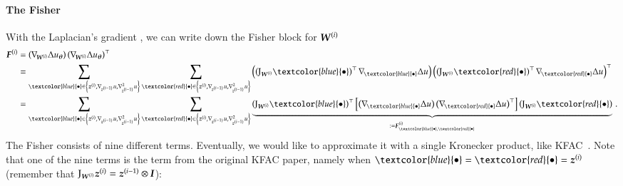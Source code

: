 \paragraph{The Fisher} With the Laplacian's gradient , we can write down the Fisher block for ${\boldsymbol{W}}^{(i)}$
\begin{align}\label{eq:fisher}
  \begin{split}
    \mF^{(i)}
    &=
      \left(
      \grad{\mW^{(i)}} \Delta u_{\vtheta}
      \right)
      \left(
      \grad{\mW^{(i)}} \Delta u_{\vtheta}
      \right)^{\top}
    \\
    &=
      \sum_{\textcolor{blue}{\bullet} \in \left\{ \vz^{(i)}, \grad{\vz^{(i-1)}}u, \gradsquared{\vz^{(i-1)}}u \right\}}
      \sum_{\textcolor{red}{\bullet} \in \left\{ \vz^{(i)}, \grad{\vz^{(i-1)}}u, \gradsquared{\vz^{(i-1)}}u \right\}}
      \left(
      \left(
      \jac_{\mW^{(i)}}\textcolor{blue}{\bullet}
      \right)^{\top}
      \grad{\textcolor{blue}{\bullet}}\Delta u
      \right)
      \left(
      \left(
      \jac_{\mW^{(i)}}\textcolor{red}{\bullet}
      \right)^{\top}
      \grad{\textcolor{red}{\bullet}}\Delta u
      \right)^{\top}
    \\
    &=
      \sum_{\textcolor{blue}{\bullet} \in \left\{ \vz^{(i)}, \grad{\vz^{(i-1)}}u, \gradsquared{\vz^{(i-1)}}u \right\}}
      \sum_{\textcolor{red}{\bullet} \in \left\{ \vz^{(i)}, \grad{\vz^{(i-1)}}u, \gradsquared{\vz^{(i-1)}}u \right\}}
      \underbrace{
      \left(
      \jac_{\mW^{(i)}}\textcolor{blue}{\bullet}
      \right)^{\top}
      \left[
      \left(
      \grad{\textcolor{blue}{\bullet}}\Delta u
      \right)
      \left(
      \grad{\textcolor{red}{\bullet}}\Delta u
      \right)^{\top}
      \right]
      \left(
      \jac_{\mW^{(i)}}\textcolor{red}{\bullet}
      \right)}_{
      := \mF^{(i)}_{\textcolor{blue}{\bullet}, \textcolor{red}{\bullet}}
      }\,.
  \end{split}
\end{align}
The Fisher consists of nine different terms.
Eventually, we would like to approximate it with a single Kronecker product, like KFAC~\citep{martens2015optimizing}.
Note that one of the nine terms is the term from the original KFAC paper, namely
when $\textcolor{blue}{\bullet} = \textcolor{red}{\bullet} = \vz^{(i)}$
(remember that $\mathrm{J}_{{\boldsymbol{W}}^{(i)}} {\boldsymbol{z}}^{(i)} = {\boldsymbol{z}}^{(i-1)} \otimes {\boldsymbol{I}}$):
